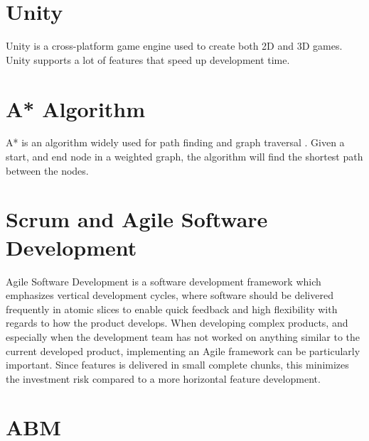 

\section{Unity}
Unity is a cross-platform game engine used to create both 2D and 3D games. Unity supports a lot of features that speed up development time. 



\section{A* Algorithm}
    A* is an algorithm widely used for path finding and graph traversal \cite{A-Star-Algorithm}. Given a start, and end node in a weighted graph, the algorithm will find the shortest path between the nodes. 



\section{Scrum and Agile Software Development}
Agile Software Development is a software development framework which emphasizes vertical development cycles, where software should be delivered frequently in atomic slices to enable quick feedback and high flexibility with regards to how the product develops. When developing complex products, and especially when the development team has not worked on anything similar to the current developed product, implementing an Agile framework can be particularly important. Since features is delivered in small complete chunks, this minimizes the investment risk compared to a more horizontal feature development. 

\section{ABM}

